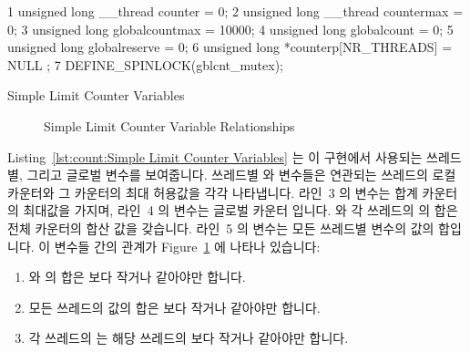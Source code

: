 \begin{listing}[tbp]
{ \scriptsize
\begin{verbbox}
  1 unsigned long __thread counter = 0;
  2 unsigned long __thread countermax = 0;
  3 unsigned long globalcountmax = 10000;
  4 unsigned long globalcount = 0;
  5 unsigned long globalreserve = 0;
  6 unsigned long *counterp[NR_THREADS] = { NULL };
  7 DEFINE_SPINLOCK(gblcnt_mutex);
\end{verbbox}
}
\centering
\theverbbox
\caption{Simple Limit Counter Variables}
\label{lst:count:Simple Limit Counter Variables}
\end{listing}

\begin{figure}[tb]
\centering
{}
\caption{Simple Limit Counter Variable Relationships}
\label{fig:count:Simple Limit Counter Variable Relationships}
\end{figure}

Listing~\ref{lst:count:Simple Limit Counter Variables} 는 이 구현에서 사용되는
쓰레드별, 그리고 글로벌 변수를 보여줍니다.
쓰레드별  와  변수들은 연관되는 쓰레드의 로컬
카운터와 그 카운터의 최대 허용값을 각각 나타냅니다.
라인~3 의  변수는 합계 카운터의 최대값을 가지며, 라인~4 의
 변수는 글로벌 카운터 입니다.
 와 각 쓰레드의  의 합은 전체 카운터의 합산 값을
갖습니다.
라인~5 의  변수는 모든 쓰레드별  변수의 값의
합입니다.
이 변수들 간의 관계가
Figure~\ref{fig:count:Simple Limit Counter Variable Relationships} 에 나타나
있습니다:
\begin{enumerate}
\item	{} 와  의 합은  보다
	작거나 같아야만 합니다.
\item	모든 쓰레드의  값의 합은  보다 작거나
	같아야만 합니다.
\item	각 쓰레드의  는 해당 쓰레드의  보다 작거나
	같아야만 합니다.
\end{enumerate}
\iffalse

